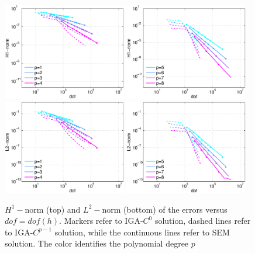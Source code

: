 \documentclass[11pt]{article}
\begin{document}
\begin{figure}
\includegraphics[width=0.48\textwidth]{Images/errdofH1_3d_ha.eps}
\includegraphics[width=0.48\textwidth]{Images/errdofH1_3d_hb.eps}\\
\includegraphics[width=0.48\textwidth]{Images/errdofL2_3d_ha.eps}
\includegraphics[width=0.48\textwidth]{Images/errdofL2_3d_hb.eps}\\
\caption{$H^1-$norm   (top) and $L^2-$norm (bottom) of the errors versus 
$dof=dof(h)$.
Markers refer to IGA-$C^0$ solution, dashed lines refer to IGA-$C^{p-1}$
solution, while the continuous lines refer to SEM solution. 
The color identifies the polynomial degree $p$}
\label{fig:errori_H1L2_dofh}
\end{figure}
\end{document}

